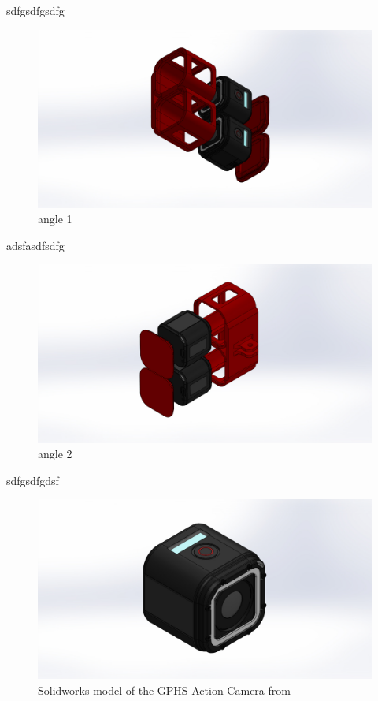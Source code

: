 sdfgsdfgsdfg

\begin{figure}[!ht]
  \includegraphics[width=\linewidth]{figures/stereoHolder1.JPG}
  \caption{angle 1}
  \label{fig:finalcase1}
\end{figure}

adsfasdfsdfg


\begin{figure}[!ht]
  \includegraphics[width=\linewidth]{figures/stereoHolder2.JPG}
  \caption{angle 2}
  \label{fig:finalcase2}
\end{figure}

sdfgsdfgdsf

\begin{figure}[!ht]
  \includegraphics[width=\linewidth]{figures/GoProHero4Session.JPG}
  \caption{Solidworks model of the GPHS Action Camera from \cite{gph4smodel}}
  \label{fig:goproherosession4}
\end{figure}

